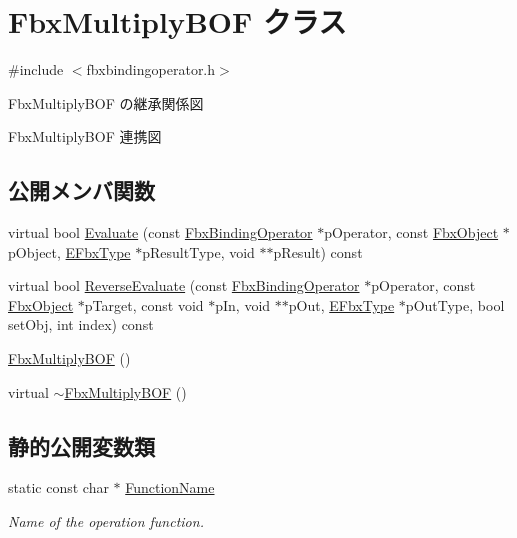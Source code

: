 \hypertarget{class_fbx_multiply_b_o_f}{}\section{Fbx\+Multiply\+B\+OF クラス}
\label{class_fbx_multiply_b_o_f}


{\ttfamily \#include $<$fbxbindingoperator.\+h$>$}



Fbx\+Multiply\+B\+OF の継承関係図


Fbx\+Multiply\+B\+OF 連携図
\subsection*{公開メンバ関数}
\begin{DoxyCompactItemize}
\item 
virtual bool \hyperlink{class_fbx_multiply_b_o_f_a8626aa9c47369019e5afed776fce72e9}{Evaluate} (const \hyperlink{class_fbx_binding_operator}{Fbx\+Binding\+Operator} $\ast$p\+Operator, const \hyperlink{class_fbx_object}{Fbx\+Object} $\ast$p\+Object, \hyperlink{fbxpropertytypes_8h_a73913a5ddfb20e57c6f25e9e6784bd92}{E\+Fbx\+Type} $\ast$p\+Result\+Type, void $\ast$$\ast$p\+Result) const
\item 
virtual bool \hyperlink{class_fbx_multiply_b_o_f_a54c8a0996a65b3d9bafcbcabf1594745}{Reverse\+Evaluate} (const \hyperlink{class_fbx_binding_operator}{Fbx\+Binding\+Operator} $\ast$p\+Operator, const \hyperlink{class_fbx_object}{Fbx\+Object} $\ast$p\+Target, const void $\ast$p\+In, void $\ast$$\ast$p\+Out, \hyperlink{fbxpropertytypes_8h_a73913a5ddfb20e57c6f25e9e6784bd92}{E\+Fbx\+Type} $\ast$p\+Out\+Type, bool set\+Obj, int index) const
\item 
\hyperlink{class_fbx_multiply_b_o_f_a4311cfe0f6d9e62ec3a673212f152f4a}{Fbx\+Multiply\+B\+OF} ()
\item 
virtual \hyperlink{class_fbx_multiply_b_o_f_a1c6854db53a1dc83c0c30760e14d391c}{$\sim$\+Fbx\+Multiply\+B\+OF} ()
\end{DoxyCompactItemize}
\subsection*{静的公開変数類}
\begin{DoxyCompactItemize}
\item 
static const char $\ast$ \hyperlink{class_fbx_multiply_b_o_f_aac9bacaab22a2dcd18c16b703892d35b}{Function\+Name}
\begin{DoxyCompactList}\small\item\em Name of the operation function. \end{DoxyCompactList}\end{DoxyCompactItemize}


